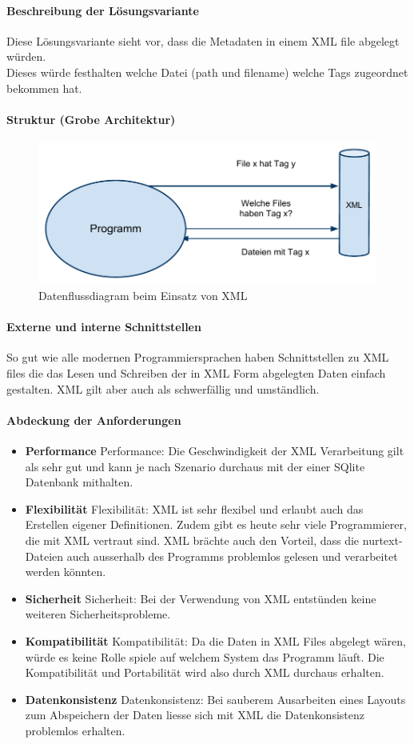 \documentclass[10pt,paper=a4,final]{scrartcl}
\begin{document}
\paragraph{Beschreibung der L\"osungsvariante}
Diese Lösungsvariante sieht vor, dass die Metadaten in einem XML file abgelegt würden.\\
Dieses würde festhalten welche Datei (path und filename) welche Tags zugeordnet bekommen hat.
\paragraph{Struktur (Grobe Architektur)}
  \begin{figure}[h!]
    \includegraphics[width = \textwidth]{datenfluss_xml.pdf}
    \caption{Datenflussdiagram beim Einsatz von XML}
  \end{figure}
\paragraph{Externe und interne Schnittstellen}
So gut wie alle modernen Programmiersprachen haben Schnittstellen zu XML files die das Lesen und Schreiben der in XML Form abgelegten Daten einfach gestalten. XML gilt aber auch als schwerfällig und umständlich\cite{json}.
\paragraph{Abdeckung der Anforderungen}
\begin{itemize}
  \item {\bf Performance} Performance: Die Geschwindigkeit der XML Verarbeitung gilt als sehr gut und kann je nach Szenario durchaus mit der einer SQlite Datenbank mithalten.
  \item {\bf Flexibilität} Flexibilität: XML ist sehr flexibel und erlaubt auch das Erstellen eigener Definitionen. Zudem gibt es heute sehr viele Programmierer, die mit XML vertraut sind.
  XML brächte auch den Vorteil, dass die nurtext-Dateien auch ausserhalb des Programms problemlos gelesen und verarbeitet werden könnten.
  \item {\bf Sicherheit} Sicherheit: Bei der Verwendung von XML entstünden keine weiteren Sicherheitsprobleme.
  \item {\bf Kompatibilit\"at} Kompatibilität: Da die Daten in XML Files abgelegt wären, würde es keine Rolle spiele auf welchem System das Programm läuft. Die Kompatibilität und Portabilität wird also durch XML durchaus erhalten.
  \item {\bf Datenkonsistenz} Datenkonsistenz: Bei sauberem Ausarbeiten eines Layouts zum Abspeichern der Daten liesse sich mit XML die Datenkonsistenz problemlos erhalten.
\end{itemize}
\end{document}
